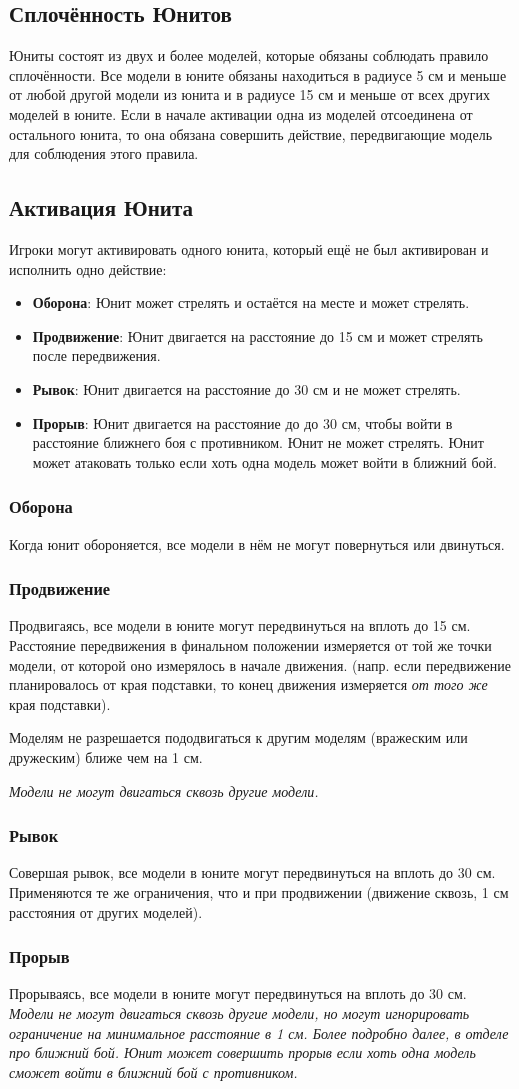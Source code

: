 \documentclass[twocolumn]{article}
\newcommand{\h}[1]{\textbf{#1}}
\newcommand{\subsec}[1]{\subsection{#1}\label{subsec:#1}}
\newcommand{\subsubsec}[1]{\subsubsection{#1}\label{subsubsec:#1}}
\begin{document}
\subsec{Сплочённость Юнитов}
Юниты состоят из двух и более моделей, которые обязаны соблюдать правило сплочённости.
Все модели в юните обязаны находиться в радиусе 5 см и меньше от любой другой модели из юнита и в радиусе 15 см и меньше от всех других моделей в юните.
Если в начале активации одна из моделей отсоединена от остального юнита, то она обязана совершить действие, передвигающие модель для соблюдения этого правила.

\subsec{Активация Юнита}
Игроки могут активировать одного юнита, который ещё не был активирован и исполнить одно действие:
\begin{itemize}
    \item \h{Оборона}: Юнит может стрелять и остаётся на месте и может стрелять.
    \item \h{Продвижение}: Юнит двигается на расстояние до 15 см и может стрелять после передвижения.
    \item \h{Рывок}: Юнит двигается на расстояние до 30 см и не может стрелять.
    \item \h{Прорыв}: Юнит двигается на расстояние до до 30 см, чтобы войти в расстояние ближнего боя с противником. Юнит не может стрелять. Юнит может атаковать только если хоть одна модель может войти в ближний бой.
\end{itemize}

\newpage

\subsubsec{Оборона}
Когда юнит обороняется, все модели в нём не могут повернуться или двинуться.

\subsubsec{Продвижение}
Продвигаясь, все модели в юните могут передвинуться на вплоть до 15 см. Расстояние передвижения в финальном положении измеряется от той же точки модели, от которой оно измерялось в начале движения. (напр. если передвижение планировалось от края подставки, то конец движения измеряется \emph{от того же} края подставки).

Моделям не разрешается пододвигаться к другим моделям (вражеским или дружеским) ближе чем на 1 см.

\emph{Модели не могут двигаться сквозь другие модели.}

\subsubsec{Рывок}
Совершая рывок, все модели в юните могут передвинуться на вплоть до 30 см. Применяются те же ограничения, что и при продвижении (движение сквозь, 1 см расстояния от других моделей).

\subsubsec{Прорыв}
Прорываясь, все модели в юните могут передвинуться на вплоть до 30 см. \emph{Модели не могут двигаться сквозь другие модели, но могут игнорировать ограничение на минимальное расстояние в 1 см. Более подробно далее, в отделе про ближний бой. Юнит может совершить прорыв если хоть одна модель сможет войти в ближний бой с противником.}
\end{document}
